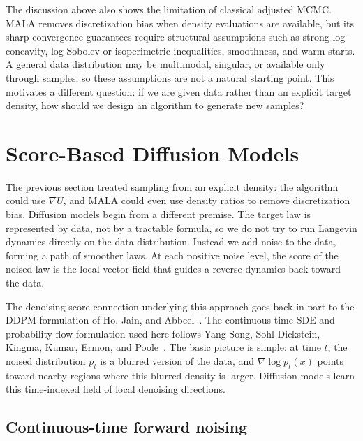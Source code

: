 \documentclass{amsart}
\numberwithin{equation}{section}
\theoremstyle{plain}
\theoremstyle{definition}
\theoremstyle{remark}
\begin{document}
The discussion above also shows the limitation of classical adjusted MCMC\@.  MALA removes discretization bias when density evaluations are
available, but its sharp convergence guarantees require structural assumptions
such as strong log-concavity, log-Sobolev or isoperimetric inequalities,
smoothness, and warm starts.  A general data distribution may be multimodal,
singular, or available only through samples, so these assumptions are not a
natural starting point.  This motivates a different question: if we are given
data rather than an explicit target density, how should we design an algorithm
to generate new samples?

\section{Score-Based Diffusion Models}

The previous section treated sampling from an explicit density: the algorithm
could use $\nabla U$, and MALA could even use density ratios to remove
discretization bias.  Diffusion models begin from a different premise.  The
target law is represented by data, not by a tractable formula, so we do not try
to run Langevin dynamics directly on the data distribution.  Instead we add
noise to the data, forming a path of smoother laws.  At each positive noise
level, the score of the noised law is the local vector field that guides a
reverse dynamics back toward the data.

The denoising-score connection underlying this approach goes back in part to
the DDPM formulation of Ho, Jain, and Abbeel~\cite{ho2020ddpm}.  The
continuous-time SDE and probability-flow formulation used here follows Yang Song,
Sohl-Dickstein, Kingma, Kumar, Ermon, and Poole~\cite{song2021score}.  The
basic picture is simple: at time $t$, the noised distribution $p_t$ is a
blurred version of the data, and $\nabla\log p_t(x)$ points toward nearby
regions where this blurred density is larger.  Diffusion models learn this
time-indexed field of local denoising directions.

\subsection{Continuous-time forward noising}
\end{document}
